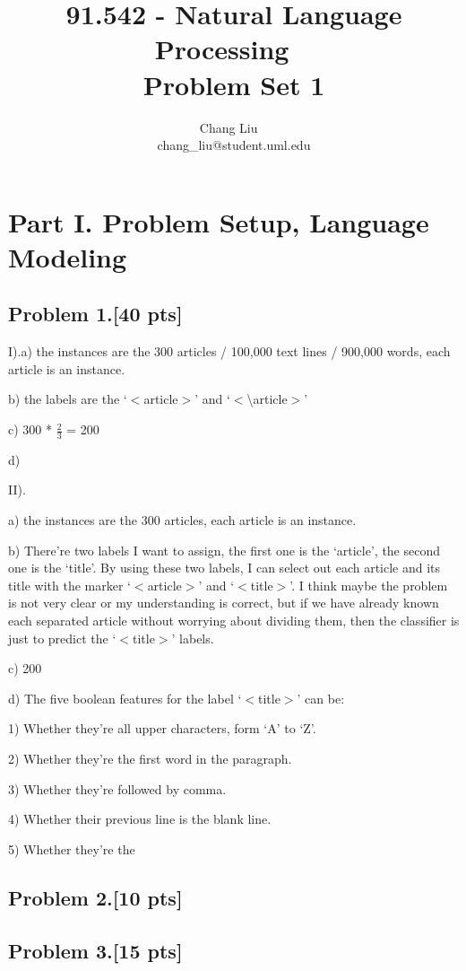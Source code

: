 \documentclass{article}
\title{91.542 - Natural Language Processing ~\\ Problem Set 1}
\author{Chang Liu ~\\ chang\_liu@student.uml.edu}
\begin{document}
\maketitle


\section{Part I. Problem Setup, Language Modeling}

\subsection{Problem 1.[40 pts]}

I).a) the instances are the 300 articles / 100,000 text lines / 900,000 words, each article is an instance.

b) the labels are the `$<$article$>$' and `$<$\textbackslash{}article$>$'

c) 300 * $\frac{2}{3}$ = 200

d) 

II). 

a) the instances are the 300 articles, each article is an instance.

b) There're two labels I want to assign, the first one is the `article', the second one is the `title'. By using these two labels, I can select out each article and its title with the marker `$<$article$>$' and `$<$title$>$'. I think maybe the problem is not very clear or my understanding is correct, but if we have already known each separated article without worrying about dividing them, then the classifier is just to predict the `$<$title$>$' labels.

c) 200

d) The five boolean features for the label `$<$title$>$' can be:

1) Whether they're all upper characters, form `A' to `Z'.

2) Whether they're the first word in the paragraph.

3) Whether they're followed by comma.

4) Whether their previous line is the blank line.

5) Whether they're the


\subsection{Problem 2.[10 pts]}


\subsection{Problem 3.[15 pts]}
\end{document}
